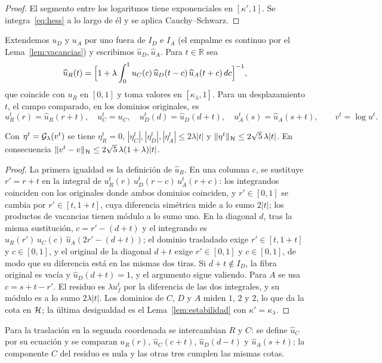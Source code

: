 \begin{proof}
El segmento entre los logaritmos tiene exponenciales en $[\kappa',1]$. Se integra~\eqref{eq:hess} a lo
largo de él y se aplica Cauchy--Schwarz.
\end{proof}

Extendemos $u_D$ y $u_A$ por uno fuera de $I_D$ e $I_A$ (el empalme es continuo por el
Lema~\ref{lem:vacancias}) y escribimos $\widehat u_D,\widehat u_A$. Para $t\in\mathbb R$ sea
\[
 \widehat u_R(t)=\Bigl[1+\lambda\int_0^1u_C(c)\,\widehat u_D(t-c)\,\widehat u_A(t+c)\,dc\Bigr]^{-1},
\]
que coincide con $u_R$ en $[0,1]$ y toma valores en $[\kappa_\lambda,1]$. Para un desplazamiento $t$,
el campo comparado, en los dominios originales, es
\[
 u_R^t(r)=\widehat u_R(r+t),\quad u_C^t=u_C,\quad u_D^t(d)=\widehat u_D(d+t),\quad
 u_A^t(s)=\widehat u_A(s+t),\qquad v^t=\log u^t .
\]

\begin{lema}\label{lem:residuo}
Con $\eta^t={\mathcal{G}}_\lambda(v^t)$ se tiene $\eta^t_R=0$, $|\eta^t_C|,|\eta^t_D|,|\eta^t_A|\le2\lambda|t|$ y
$\|\eta^t\|_{\mathcal{H}}\le2\sqrt5\,\lambda|t|$. En consecuencia $\|v^t-v\|_{\mathcal{H}}\le2\sqrt5\,\lambda(1+\lambda)|t|$.
\end{lema}

\begin{proof}
La primera igualdad es la definición de $\widehat u_R$. En una columna $c$, se sustituye $r'=r+t$ en
la integral de $u_R^t(r)\,u_D^t(r-c)\,u_A^t(r+c)$: los integrandos coinciden con los originales donde
ambos dominios coinciden, y $r'\in[0,1]$ se cambia por $r'\in[t,1+t]$, cuya diferencia simétrica mide
a lo sumo $2|t|$; los productos de vacancias tienen módulo a lo sumo uno. En la diagonal $d$, tras la
misma sustitución, $c=r'-(d+t)$ y el integrando es $\widehat u_R(r')\,u_C(c)\,\widehat u_A(2r'-(d+t))$;
el dominio trasladado exige $r'\in[t,1+t]$ y $c\in[0,1]$, y el original de la diagonal $d+t$ exige
$r'\in[0,1]$ y $c\in[0,1]$, de modo que su diferencia está en las mismas dos tiras. Si $d+t\notin I_D$,
la fibra original es vacía y $\widehat u_D(d+t)=1$, y el argumento sigue valiendo. Para $A$ se usa
$c=s+t-r'$. El residuo es $\lambda u^t_f$ por la diferencia de las dos integrales, y su módulo es a lo
sumo $2\lambda|t|$. Los dominios de $C$, $D$ y $A$ miden $1$, $2$ y $2$, lo que da la cota en ${\mathcal{H}}$; la
última desigualdad es el Lema~\ref{lem:estabilidad} con $\kappa'=\kappa_\lambda$.
\end{proof}

Para la traslación en la segunda coordenada se intercambian $R$ y $C$: se define $\widehat u_C$ por su
ecuación y se comparan $u_R(r)$, $\widehat u_C(c+t)$, $\widehat u_D(d-t)$ y $\widehat u_A(s+t)$; la
componente $C$ del residuo es nula y las otras tres cumplen las mismas cotas.

